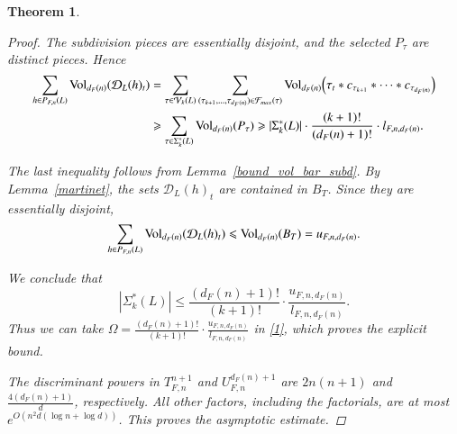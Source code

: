 \documentclass[11pt,a4paper,twoside]{amsart}
\theoremstyle{plain}
\newtheorem{theorem}{\bfseries Theorem}[section]
\theoremstyle{definition}
\newcommand{\vol}[0]{\mathrm{Vol}}
\renewcommand{\leq}{\leqslant}
\renewcommand{\geq}{\geqslant}
\begin{document}
\begin{theorem}
\begin{proof}
The subdivision pieces are essentially disjoint, and the selected $P_\tau$ are distinct pieces. Hence
$$
\begin{aligned}
\sum_{h\in\mathcal \mathcal{P}_{F,n}(L)} \vol_{d_F(n)}(\mathcal{D}_L(h)_t)
&=
\sum_{\tau \in \mathcal{V}_k(L)}
\sum_{\substack{
(\tau_{k+1},\dots,\tau_{d_F(n)})
\in \mathcal{F}_{max}(\tau)
}}
\vol_{d_F(n)}\!\left(\tau_t * c_{\tau_{k+1}} * \cdots * c_{\tau_{d_F(n)}}\right) \\
&\geq
\sum_{\tau\in\Sigma_k^*(L)}
\vol_{d_F(n)}(P_\tau) \geq |\Sigma_k^*(L)| \cdot \frac{(k+1)!}{(d_F(n)+1)!}\cdot l_{F,n,d_F(n)}.
\end{aligned}
$$

The last inequality follows from Lemma~\ref{bound_vol_bar_subd}.
By Lemma~\ref{martinet}, the sets $\mathcal{D}_L(h)_t$ are contained in $B_T$. Since they are essentially disjoint,
$$\sum_{h\in\mathcal \mathcal{P}_{F,n}(L)} \vol_{d_F(n)}(\mathcal{D}_L(h)_t) \leq \vol_{d_F(n)}(B_T)=u_{F,n,d_F(n)}.$$

We conclude that
$$|\Sigma_k^*(L)|\leq \frac{(d_F(n)+1)!}{(k+1)!}\cdot \frac{u_{F,n,d_F(n)}}{l_{F,n,d_F(n)}}.$$
Thus we can take $\Omega = \frac{(d_F(n)+1)!}{(k+1)!}\cdot \frac{u_{F,n,d_F(n)}}{l_{F,n,d_F(n)}}$ in \eqref{1}, which proves the explicit bound.

The discriminant powers in $T_{F,n}^{n+1}$ and $U_{F,n}^{d_F(n)+1}$ are $2n(n+1)$ and $\frac{4(d_F(n)+1)}{d}$, respectively. All other factors, including the factorials, are at most $e^{O(n^2d(\log n+\log d))}$. This proves the asymptotic estimate.
\end{proof}
\end{theorem}
\end{document}
